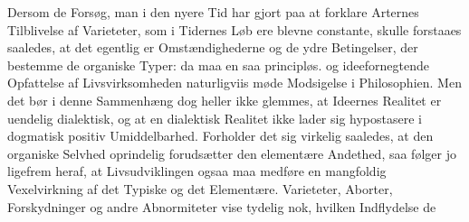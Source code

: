 \documentclass[12pt,a4paper]{book}
\begin{document}
Dersom de Forsøg, man i den nyere Tid har gjort paa at forklare Arternes
Tilblivelse af Varieteter, som i Tidernes Løb ere blevne constante, skulle
forstaaes saaledes, at det egentlig er Omstændighederne og de ydre Betingelser,
der bestemme de organiske Typer: da maa en saa principløs. og ideefornegtende
Opfattelse af Livsvirksomheden naturligviis møde Modsigelse i Philosophien. Men
det bør i denne Sammenhæng dog heller ikke glemmes, at Ideernes Realitet er
uendelig dialektisk, og at en dialektisk Realitet ikke lader sig hypostasere i
dogmatisk positiv Umiddelbarhed. Forholder det sig virkelig saaledes, at den
organiske Selvhed oprindelig forudsætter den elementære Andethed, saa følger jo
ligefrem heraf, at Livsudviklingen ogsaa maa medføre en mangfoldig
Vexelvirkning af det Typiske og det Elementære. Varieteter, Aborter,
Forskydninger og andre Abnormiteter vise tydelig nok, hvilken Indflydelse de
\end{document}

